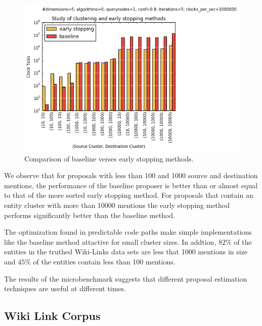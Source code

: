 \begin{figure}
\centering
\includegraphics[width=\columnwidth, clip=true,trim=0cm 0cm 0cm 1cm]{media/clustering-v-early-stopping.png}
\caption{Comparison of baseline verses early stopping methods.}
\label{fig:clustering-v-early-stopping}
\end{figure}

We observe that for proposals with less than 100 and 1000 source and
destination mentions, the performance of the baseline proposer is better than
or almost equal to that of the more sorted early stopping method.
For proposals that contain an entity cluster with more than 10000 mentions
the early stopping method performs significantly better than the baseline method.

The optimization found in predictable code paths make simple implementations
like the baseline method attactive for small cluster sizes.
In addtion, $82\%$ of the entities in the truthed Wiki-Links data sets are less
that 1000 mentions in size and $45\%$ of the entities contain less than 100
mentions.

The results of the microbenchmark suggests that different proposal estimation techniques are useful at different times.




\subsection{Wiki Link Corpus}



